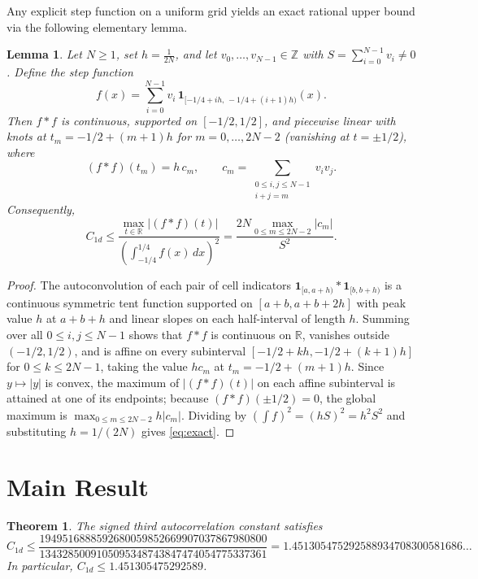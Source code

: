 \documentclass[11pt]{article}
\newtheorem{theorem}{Theorem}
\newtheorem{lemma}{Lemma}
\begin{document}
Any explicit step function on a uniform grid yields an exact rational upper bound via the following elementary lemma.

\begin{lemma}\label{lem:knot}
Let $N \ge 1$, set $h = \frac{1}{2N}$, and let $v_0, \dots, v_{N-1} \in \mathbb{Z}$ with $S = \sum_{i=0}^{N-1} v_i \ne 0$. Define the step function
\[
  f(x) = \sum_{i=0}^{N-1} v_i\,\mathbf{1}_{[-1/4 + ih,\, -1/4 + (i+1)h)}(x).
\]
Then $f * f$ is continuous, supported on $[-1/2, 1/2]$, and piecewise linear with knots at $t_m = -1/2 + (m+1)h$ for $m = 0, \dots, 2N-2$ (vanishing at $t = \pm 1/2$), where
\[
  (f * f)(t_m) = h\, c_m, \qquad c_m = \sum_{\substack{0 \le i, j \le N-1 \\ i + j = m}} v_i v_j.
\]
Consequently,
\begin{equation}\label{eq:exact}
  C_{1d} \le \frac{\max_{t \in \mathbb{R}} |(f * f)(t)|}{\left(\int_{-1/4}^{1/4} f(x)\,dx\right)^2} = \frac{2N \max_{0 \le m \le 2N-2} |c_m|}{S^2}.
\end{equation}
\end{lemma}

\begin{proof}
The autoconvolution of each pair of cell indicators $\mathbf{1}_{[a,a+h)} * \mathbf{1}_{[b,b+h)}$ is a continuous symmetric tent function supported on $[a+b, a+b+2h]$ with peak value $h$ at $a+b+h$ and linear slopes on each half-interval of length $h$. Summing over all $0 \le i,j \le N-1$ shows that $f * f$ is continuous on $\mathbb{R}$, vanishes outside $(-1/2, 1/2)$, and is affine on every subinterval $[-1/2 + kh, -1/2 + (k+1)h]$ for $0 \le k \le 2N-1$, taking the value $h c_m$ at $t_m = -1/2 + (m+1)h$. Since $y \mapsto |y|$ is convex, the maximum of $|(f*f)(t)|$ on each affine subinterval is attained at one of its endpoints; because $(f*f)(\pm 1/2) = 0$, the global maximum is $\max_{0 \le m \le 2N-2} h |c_m|$. Dividing by $(\int f)^2 = (h S)^2 = h^2 S^2$ and substituting $h = 1/(2N)$ gives \eqref{eq:exact}.
\end{proof}

\section{Main Result}

\begin{theorem}\label{thm:main}
The signed third autocorrelation constant satisfies
\[
  C_{1d} \le \frac{1949516888592680059852669907037867980800}{1343285009105095348743847474054775337361} = 1.451305475292588934708300581686\ldots
\]
In particular, $C_{1d} \le 1.451305475292589$.
\end{theorem}
\end{document}
